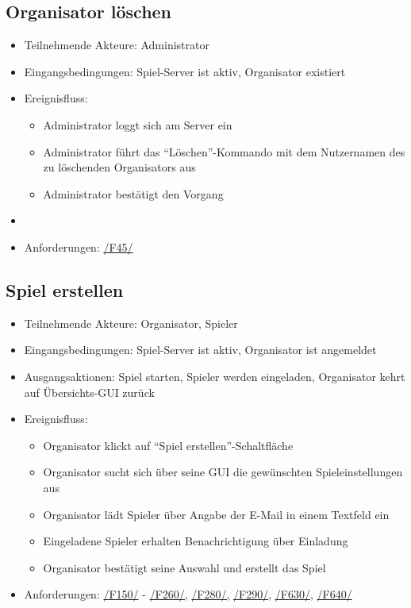 \documentclass[a4paper]{scrreprt}
\begin{document}
    \subsection{Organisator löschen}
    \begin{itemize}
        \item Teilnehmende Akteure: \Gls{Administrator}
        \item Eingangsbedingungen: \Gls{Spiel-Server} ist aktiv, \Gls{Organisator} existiert
        \item Ereignisfluss:
        \begin{itemize}
            \item \Gls{Administrator} loggt sich am Server ein
            \item \Gls{Administrator} führt das \enquote{Löschen}-Kommando mit dem Nutzernamen des zu löschenden \Gls{Organisator}s aus
            \item \Gls{Administrator} bestätigt den Vorgang
        \end{itemize}
        \item \item Anforderungen: \hyperlink{F45}{/F45/}
    \end{itemize}

    \subsection{Spiel erstellen}
    \begin{itemize}
        \item Teilnehmende Akteure: \Gls{Organisator}, \Gls{Spieler}
        \item Eingangsbedingungen: \Gls{Spiel-Server} ist aktiv, \Gls{Organisator} ist angemeldet
        \item Ausgangsaktionen: \Gls{Spiel} starten, \Gls{Spieler} werden eingeladen, \Gls{Organisator} kehrt auf Übersichts-GUI zurück
        \item Ereignisfluss:
        \begin{itemize}
            \item \Gls{Organisator} klickt auf \enquote{Spiel erstellen}-Schaltfläche
            \item \Gls{Organisator} sucht sich über seine GUI die gewünschten \Gls{Spieleinstellungen} aus
            \item \Gls{Organisator} lädt \Gls{Spieler} über Angabe der E-Mail in einem Textfeld ein
            \item Eingeladene \Gls{Spieler} erhalten Benachrichtigung über Einladung
            \item \Gls{Organisator} bestätigt seine Auswahl und erstellt das Spiel
        \end{itemize}
        \item Anforderungen: \hyperlink{F150}{/F150/} - \hyperlink{F260}{/F260/,} \hyperlink{F280}{/F280/,} \hyperlink{F290}{/F290/}, \hyperlink{F630}{/F630/}, \hyperlink{F640}{/F640/}
    \end{itemize}
\end{document}
